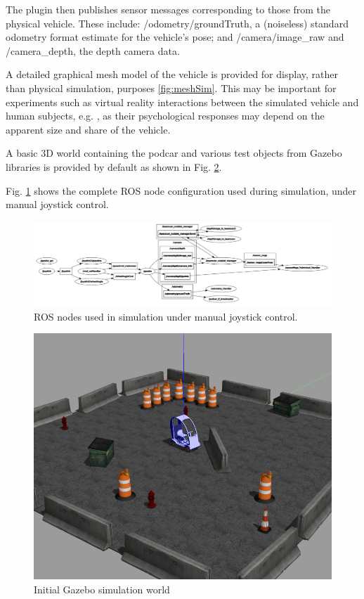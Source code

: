 \documentclass[a4paper]{article}
\begin{document}
The plugin then publishes sensor messages corresponding to those from the physical vehicle. These include:  /odometry/groundTruth, a (noiseless) standard odometry format estimate for the vehicle’s pose; and /camera/image\_raw and /camera\_depth, the depth camera data.

A detailed graphical mesh model of the vehicle is provided for display, rather than physical simulation, purposes \ref{fig:meshSim}. This may be important for experiments such as virtual reality interactions between the simulated vehicle and human subjects, e.g. \cite{camara2021evaluating}, as their psychological responses may depend on the apparent size and share of the vehicle.

A basic 3D world containing the podcar and various test objects from Gazebo libraries is provided by default as shown in Fig. \ref{fig:sim_world}.

Fig. \ref{fig:sim_nodes} shows the complete ROS node configuration used during simulation, under manual joystick control.  
\begin{figure}[h]
	\includegraphics[width=\columnwidth]{figs_sim/sim_nodes.png}
	\caption{ROS nodes used in simulation under manual joystick control.}
	\label{fig:sim_nodes}
\end{figure}

\begin{figure}[h]
	\includegraphics[width=0.5\columnwidth]{figs_sim/podcar_loaded_gazebo.png}
	\caption{Initial Gazebo simulation world}
	\label{fig:sim_world}
\end{figure}
\end{document}
